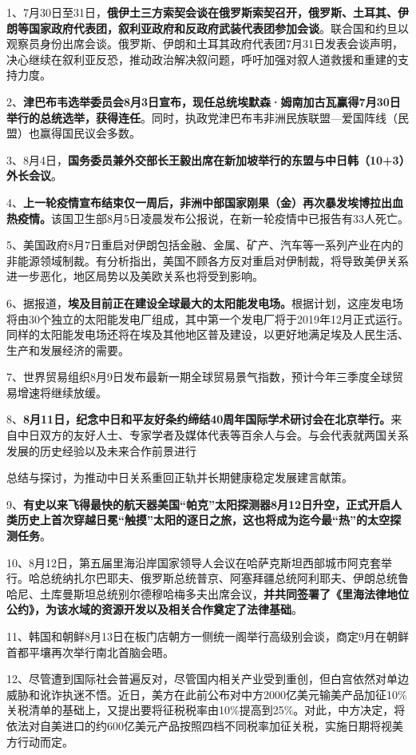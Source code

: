 1、7月30日至31日，{\textbf{俄伊土三方索契会谈在俄罗斯索契召开，俄罗斯、土耳其、伊朗等国家政府代表团，叙利亚政府和反政府武装代表团参加会谈}}。联合国和约旦以观察员身份出席会谈。俄罗斯、伊朗和土耳其政府代表团7月31日发表会谈声明，决心继续在叙利亚反恐，推动政治解决叙问题，呼吁加强对叙人道救援和重建的支持力度。

2、{\textbf{津巴布韦选举委员会8月3日宣布，现任总统埃默森·姆南加古瓦赢得7月30日举行的总统选举，获得连任}}。同时，执政党津巴布韦非洲民族联盟---爱国阵线（民盟）也赢得国民议会多数。

3、8月4日，{\textbf{国务委员兼外交部长王毅出席在新加坡举行的东盟与中日韩（10+3）外长会议}}。

4、{\textbf{上一轮疫情宣布结束仅一周后，非洲中部国家刚果（金）再次暴发埃博拉出血热疫情。}}该国卫生部8月5日凌晨发布公报说，在新一轮疫情中已报告有33人死亡。

5、美国政府8月7日重启对伊朗包括金融、金属、矿产、汽车等一系列产业在内的非能源领域制裁。有分析指出，美国不顾各方反对重启对伊制裁，将导致美伊关系进一步恶化，地区局势以及美欧关系也将受到影响。

6、据报道，{\textbf{埃及目前正在建设全球最大的太阳能发电场。}}根据计划，这座发电场将由30个独立的太阳能发电厂组成，其中第一个发电厂将于2019年12月正式运行。同样的太阳能发电场还将在埃及其他地区普及建设，以更好地满足埃及人民生活、生产和发展经济的需要。

7、世界贸易组织8月9日发布最新一期全球贸易景气指数，预计今年三季度全球贸易增速将继续放缓。

8、{\textbf{8月11日，纪念中日和平友好条约缔结40周年国际学术研讨会在北京举行。}}来自中日双方的友好人士、专家学者及媒体代表等百余人与会。与会代表就两国关系发展的历史经验以及未来合作前景进行

总结与探讨，为推动中日关系重回正轨并长期健康稳定发展建言献策。

9、{\textbf{有史以来飞得最快的航天器美国``帕克''太阳探测器8月12日升空，正式开启人类历史上首次穿越日冕``触摸''太阳的逐日之旅，这也将成为迄今最``热''的太空探测任务}}。

10、8月12日，第五届里海沿岸国家领导人会议在哈萨克斯坦西部城市阿克套举行。哈总统纳扎尔巴耶夫、俄罗斯总统普京、阿塞拜疆总统阿利耶夫、伊朗总统鲁哈尼、土库曼斯坦总统别尔德穆哈梅多夫出席会议，{\textbf{并共同签署了《里海法律地位公约》，为该水域的资源开发以及相关合作奠定了法律基础}}。

11、韩国和朝鲜8月13日在板门店朝方一侧统一阁举行高级别会谈，商定9月在朝鲜首都平壤再次举行南北首脑会晤。

12、尽管遭到国际社会普遍反对，尽管国内相关产业受到重创，但白宫依然对单边威胁和讹诈执迷不悟。近日，美方在此前公布对中方2000亿美元输美产品加征10\%关税清单的基础上，又提出要将征税税率由10\%提高到25\%。对此，中方决定，将依法对自美进口的约600亿美元产品按照四档不同税率加征关税，实施日期将视美方行动而定。

